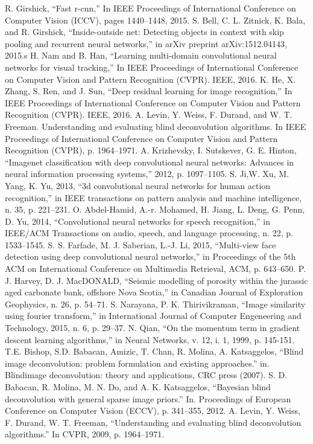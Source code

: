 \documentclass[conference,compsoc]{IEEEtran}
\begin{document}
\begin{thebibliography}{1}
		R. Girshick, ``Fast r-cnn,'' In IEEE Proceedings of International Conference on Computer Vision (ICCV), pages 1440–1448, 2015.
 			S. Bell, C. L. Zitnick, K. Bala, and R. Girshick, ``Inside-outside net: Detecting objects in context with skip pooling and recurrent neural networks,'' in arXiv preprint arXiv:1512.04143, 2015.s
			H. Nam and B. Han, ``Learning multi-domain convolutional neural networks for visual tracking,'' In IEEE Proceedings of International Conference on Computer Vision and Pattern Recognition (CVPR). IEEE, 2016.
			K. He, X. Zhang, S. Ren, and J. Sun, ``Deep residual learning for image recognition,'' In IEEE Proceedings of International Conference on Computer Vision and Pattern Recognition (CVPR). IEEE, 2016.
			A. Levin, Y. Weiss, F. Durand, and W. T. Freeman. Understanding and evaluating blind deconvolution algorithms. In IEEE Proceedings of International Conference on Computer Vision and Pattern Recognition (CVPR), p. 1964–1971.
		A. Krizhevsky, I. Sutskever, G. E. Hinton, ``Imagenet classification with deep convolutional neural networks: Advances in neural information processing systems,'' 2012, p. 1097–1105.
			S. Ji,W. Xu, M. Yang, K. Yu, 2013, ``3d convolutional neural networks for human action recognition,'' in IEEE transactions on pattern analysis and machine intelligence, n. 35, p. 221–231.
		O. Abdel-Hamid, A.-r. Mohamed, H. Jiang, L. Deng, G. Penn, D. Yu, 2014, ``Convolutional neural networks for speech recognition,'' in IEEE/ACM Transactions on audio, speech, and language processing, n. 22, p. 1533–1545.
		S. S. Farfade, M. J. Saberian, L.-J. Li, 2015, ``Multi-view face detection using deep convolutional neural networks,'' in Proceedings of the 5th ACM on International Conference on Multimedia Retrieval, ACM, p. 643–650.
 		P. J. Harvey, D. J. MacDONALD, ``Seismic modelling of porosity within the jurassic aged carbonate bank, offshore Nova Scotia,'' in  Canadian Journal of Exploration Geophysics, n. 26, p. 54–71.
		S. Narayana, P. K. Thirivikraman, ``Image similarity using fourier transform,'' in International Journal of Computer Engeneering and Technology, 2015, n. 6, p. 29–37.
			N. Qian, ``On the momentum term in gradient descent learning algorithms,'' in Neural Networks, v. 12, i. 1, 1999, p. 145-151.
		T.E. Bishop, S.D. Babacan, Amizic, T. Chan, R. Molina, A. Katsaggelos, ``Blind image deconvolution: problem formulation and existing approaches.'' in. Blindimage deconvolution: theory and applications,  CRC press (2007).
		S. D. Babacan, R. Molina, M. N. Do, and A. K. Katsaggelos, ``Bayesian blind deconvolution with general sparse image priors.'' In. Proceedings of European Conference on Computer Vision (ECCV), p. 341–355, 2012.
			A. Levin, Y. Weiss, F. Durand, W. T. Freeman, ``Understanding and evaluating blind deconvolution algorithms.''  In CVPR, 2009, p. 1964–1971.
\end{thebibliography}
\end{document}
